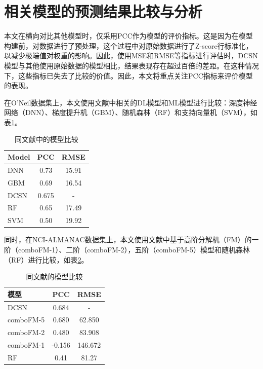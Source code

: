 
\section{相关模型的预测结果比较与分析}

本文在横向对比其他模型时，仅采用PCC作为模型的评价指标。这是因为在模型构建前，对数据进行了预处理，这个过程中对原始数据进行了Z-score行标准化，以减少极端值对权重的影响。因此，使用MSE和RMSE等指标进行评估时，DCSN模型与其他使用原始数据的模型相比，结果表现存在超过百倍的差距。在这种情况下，这些指标已失去了比较的价值。因此，本文将重点关注PCC指标来评价模型的表现。

在O'Neil数据集上，本文使用文献\cite{13}中相关的DL模型和ML模型进行比较：深度神经网络（DNN）、梯度提升机（GBM）、随机森林（RF）和支持向量机（SVM），如表\ref{table:model-evaluation}。

\begin{table}[htbp]
  \centering
  \caption{同文献\cite{13}中的模型比较}
  \label{table:model-evaluation}
  \small
  \begin{tabular}{p{4cm}cc}
    \toprule
    Model & PCC & RMSE \\
    \midrule
    DNN & 0.73 & 15.91 \\
    GBM & 0.69 & 16.54 \\
    DCSN & 0.675 & - \\
    RF & 0.65 & 17.49 \\
    SVM & 0.50 & 19.92 \\
    \bottomrule
  \end{tabular}
\end{table}

同时，在NCI-ALMANAC数据集上，本文使用文献\cite{18}中基于高阶分解机（FM）的一阶（comboFM-1）、二阶（comboFM-2），五阶（comboFM-5）模型和随机森林（RF）进行比较，如表\ref{table:sl-evaluation}。

\begin{table}[htbp]
  \centering
  \caption{同文献\cite{18}的模型比较}
  \label{table:sl-evaluation}
  \small
  \begin{tabular}{p{4cm}cc}
    \toprule
    模型 & PCC & RMSE \\
    \midrule
    DCSN & 0.684 & - \\
    comboFM-5 & 0.680 & 62.850 \\
    comboFM-2 & 0.480 & 83.908 \\
    comboFM-1 & -0.156 & 146.672 \\
    RF & 0.41 & 81.27 \\
    \bottomrule
  \end{tabular}
\end{table}

